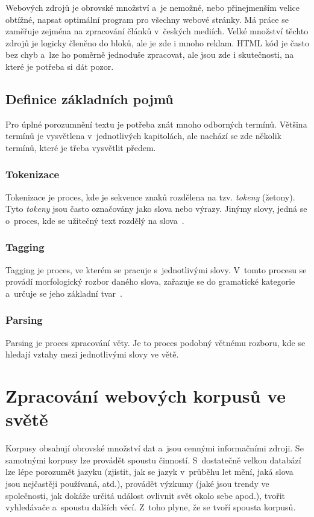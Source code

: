 Webových zdrojů je obrovské množství a~je nemožné, nebo přinejmenším velice obtížné, napsat optimální program
pro všechny webové stránky. Má práce se zaměřuje zejména na zpracování článků v~českých mediích. Velké množství těchto zdrojů
je logicky členěno do bloků, ale je zde i mnoho reklam. HTML kód je často bez chyb a~lze ho poměrně jednoduše
zpracovat, ale jsou zde i skutečnosti, na které je potřeba si dát pozor.

\section{Definice základních pojmů}
Pro úplné porozumnění textu je potřeba znát mnoho odborných termínů. Většina termínů je vysvětlena
v~jednotlivých kapitolách, ale nachází se zde několik termínů, které je třeba vysvětlit předem.

\subsection{Tokenizace}
\label{Tokenizace}
Tokenizace je proces, kde je sekvence znaků rozdělena na tzv. \textit{tokeny} (žetony). Tyto \textit{tokeny} jsou
často označovány jako slova nebo výrazy. Jinýmy slovy, jedná se o~proces, kde se užitečný text rozdělý na slova~\cite{TOKENIZACE}.

\subsection{Tagging}
\label{Tagging}
Tagging je proces, ve kterém se pracuje s~jednotlivými slovy. V~tomto procesu se provádí morfologický rozbor daného slova,
zařazuje se do gramatické kategorie a~určuje se jeho základní tvar~\cite{TAGGING}.

\subsection{Parsing}
\label{Parsing}
Parsing je proces zpracování věty. Je to proces podobný větnému rozboru, kde se hledají vztahy mezi jednotlivými slovy
ve větě.

\chapter{Zpracování webových korpusů ve světě}
Korpusy obsahují obrovské množství dat a~jsou cennými informačními zdroji. Se samotnými korpusy
lze provádět spoustu činností. S~dostatečně velkou databází lze lépe porozumět jazyku
(zjistit, jak se jazyk v~průběhu let mění, jaká slova jsou nejčastěji používaná, atd.),
provádět výzkumy (jaké jsou trendy ve společnosti, jak dokáže určitá událost ovlivnit svět okolo sebe apod.),
tvořit vyhledávače a~spoustu dalších věcí. Z~toho plyne, že se tvoří spousta korpusů.

